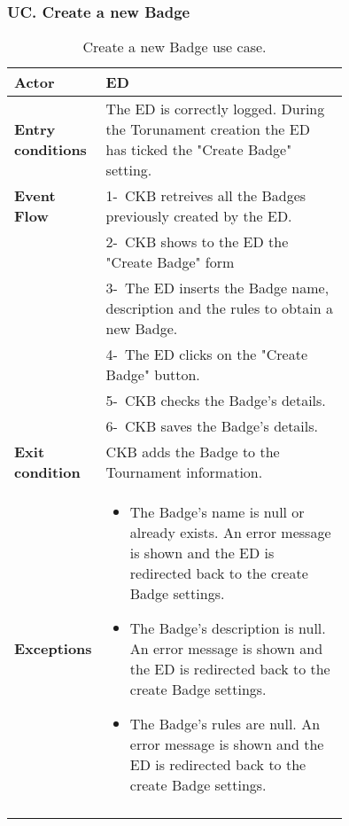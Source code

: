 \newpage

\subsubsection*{UC\cuc . Create a new Badge}
\begin{center}
    \begin{longtable}{|l|p{0.75\linewidth}|}
        \hline
        \textbf{Actor}            & ED \\
        \hline
        \textbf{Entry conditions} & The ED is correctly logged. During the Torunament creation the ED has ticked the "Create Badge" setting.        \\
        \hline
        \textbf{Event Flow}       & 1-\ CKB retreives all the Badges previously created by the ED. \\
        & 2-\ CKB shows to the ED the "Create Badge" form \\
        & 3-\ The ED inserts the Badge name, description and the rules to obtain a new Badge. \\
        & 4-\ The ED clicks on the "Create Badge" button. \\
        & 5-\ CKB checks the Badge's details. \\
        & 6-\ CKB saves the Badge's details. \\
        \hline
        \textbf{Exit condition}   & CKB adds the Badge to the Tournament information.      \\
        \hline
        \textbf{Exceptions}        & \begin{itemize}
            \item The Badge's name is null or already exists. An error message is shown and the ED is redirected back to the create Badge settings.
            \item The Badge's description is null. An error message is shown and the ED is redirected back to the create Badge settings.
            \item The Badge's rules are null. An error message is shown and the ED is redirected back to the create Badge settings.
         \end{itemize}    \\
        \hline
        \caption{Create a new Badge use case.}
        \label{tab: create_a_badge_use_case}
    \end{longtable}
\end{center}


